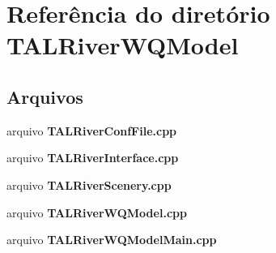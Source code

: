\section{Referência do diretório T\+A\+L\+River\+W\+Q\+Model}
\label{dir_3b09e96b06083c2528f133705f3af44d}
\subsection*{Arquivos}
\begin{DoxyCompactItemize}
\item 
arquivo {\bf T\+A\+L\+River\+Conf\+File.\+cpp}
\item 
arquivo {\bf T\+A\+L\+River\+Interface.\+cpp}
\item 
arquivo {\bf T\+A\+L\+River\+Scenery.\+cpp}
\item 
arquivo {\bf T\+A\+L\+River\+W\+Q\+Model.\+cpp}
\item 
arquivo {\bf T\+A\+L\+River\+W\+Q\+Model\+Main.\+cpp}
\end{DoxyCompactItemize}
